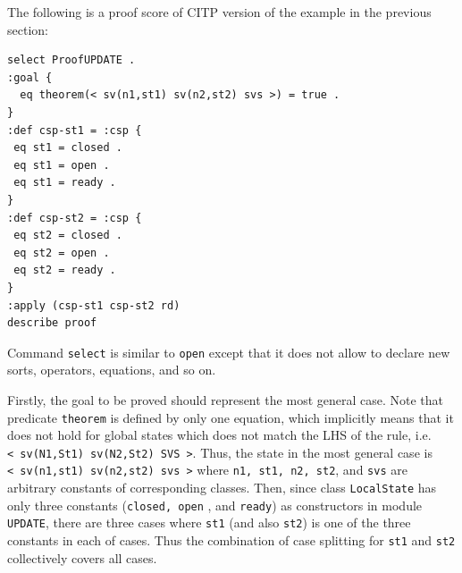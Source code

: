 \documentclass[12pt]{report}
\newcommand{\stt}[1]{{\small{\tt {#1}}}}
\begin{document}
The following is a proof score of CITP version of the example in the previous section:
\begin{verbatim}
select ProofUPDATE .
:goal {
  eq theorem(< sv(n1,st1) sv(n2,st2) svs >) = true .
}
:def csp-st1 = :csp {
 eq st1 = closed .
 eq st1 = open .
 eq st1 = ready .
}
:def csp-st2 = :csp {
 eq st2 = closed .
 eq st2 = open .
 eq st2 = ready .
}
:apply (csp-st1 csp-st2 rd)
describe proof
\end{verbatim}
Command {\tt select} is similar to {\tt open} except that it does not
allow to declare new sorts, operators, equations, and so on. 

Firstly, the goal to be proved should represent the most general case.
Note that predicate {\tt theorem} is defined by only one equation,
which implicitly means that it does not hold for global states which
does not match the LHS of the rule,
i.e. \stt{<~sv(N1,St1)~sv(N2,St2)~SVS~>}. Thus, the state in the most
general case is \stt{<~sv(n1,st1)~sv(n2,st2)~svs~>} where \stt{n1,
  st1, n2, st2}, and {\tt svs} are arbitrary constants of
corresponding classes.  Then, since class {\tt LocalState} has only
three constants ({\tt closed, open} , and {\tt ready}) as constructors
in module {\tt UPDATE}, there are three cases where {\tt st1} (and
also {\tt st2}) is one of the three constants in each of cases. Thus
the combination of case splitting for {\tt st1} and {\tt st2}
collectively covers all cases.
\end{document}
